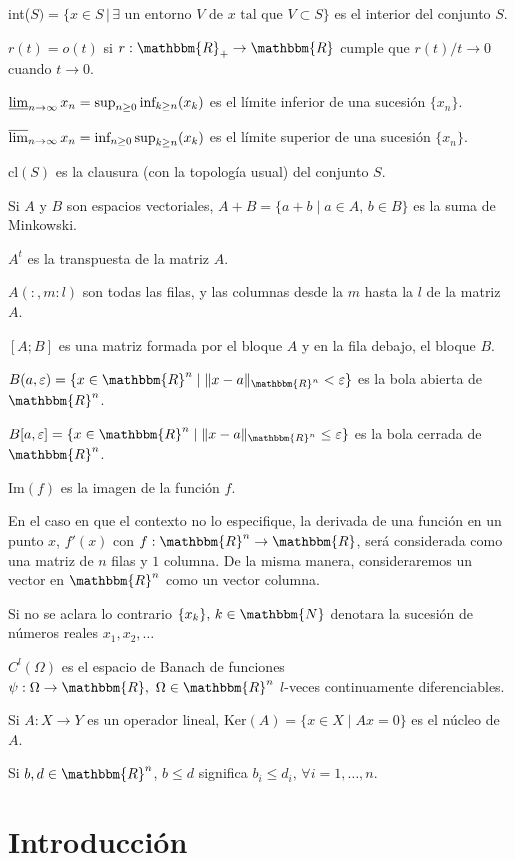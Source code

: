 \documentclass[a4paper,10pt]{book}
\newcommand{\N}{\mathbbm{N}}
\newcommand{\R}{\mathbbm{R}}
\newcommand{\Rn}{\R^n}
\newcommand{\arr}{\rightarrow}
\begin{document}
{int($S)=\{x\in S\,|\, \exists\mbox{ un entorno }V \mbox{ de }x\mbox{ tal que }V\subset S\}$ es  el interior del conjunto $S$.

$r(t)=o(t)$ si $r:\R_+\to\R$ cumple que $r(t)/t\to 0$ cuando $t\to0$.

$\varliminf_{n\to\infty}x_n=\sup_{n\geq0}\mbox{inf}_{k\geq n}(x_k)$ es el límite inferior de una sucesión $\{x_n\}$.

$\varlimsup_{n\to\infty}x_n=\mbox{inf}_{n\geq 0}\sup_{k\geq n}(x_k)$ es el límite superior de una sucesión $\{x_n\}$.

$\mbox{cl}(S)$ es la clausura (con la topología usual) del conjunto $S$.

Si $A$ y $B$ son espacios vectoriales, $A+B=\{a+b\mid a\in A,\, b\in B\}$ es la suma de Minkowski.

$A^t$ es la transpuesta de la matriz $A$.


$A(:,m:l)$ son todas las filas, y las columnas desde la $m$ hasta la $l$ de la matriz $A$.

$[A;B]$ es una matriz formada por el bloque $A$ y en la fila debajo, el bloque $B$.

$B(a,\varepsilon)=\{x\in\Rn\mid \|x-a\|_{\Rn}<\varepsilon\}$ es la bola abierta de $\Rn$.

$B[a,\varepsilon]=\{x\in\Rn\mid \|x-a\|_{\Rn}\leq\varepsilon\}$ es la bola cerrada de $\Rn$.

$\mathrm{Im}(f)$ es la imagen de la función $f$. 

\hangindent=1cm En el caso en que el contexto no lo especifique, la derivada de una función en un punto $x$, $f'(x)$ con $f:\Rn\arr\R$, será considerada como una matriz de $n$ filas y $1$ columna. De la misma manera, consideraremos un vector en $\Rn$ como un vector columna.

Si no se aclara lo contrario $\{x_k\},\, k\in\N$ denotara la sucesión de números reales $x_1,x_2,\ldots$

$C^l(\Omega)$ es el espacio de Banach de funciones $\psi:\Omega\arr\R,\ \Omega\in\Rn$ $l$-veces continuamente diferenciables. 

Si $A:X\arr Y$ es un operador lineal, $\mathrm{Ker}(A)=\{x\in X\mid Ax=0\}$ es el núcleo de $A$.

Si $b,d\in\Rn$, $b\leq d$ significa $b_i\leq d_i,\,\forall i=1,\ldots,n$.

}

\chapter*{Introducción}
\end{document}
